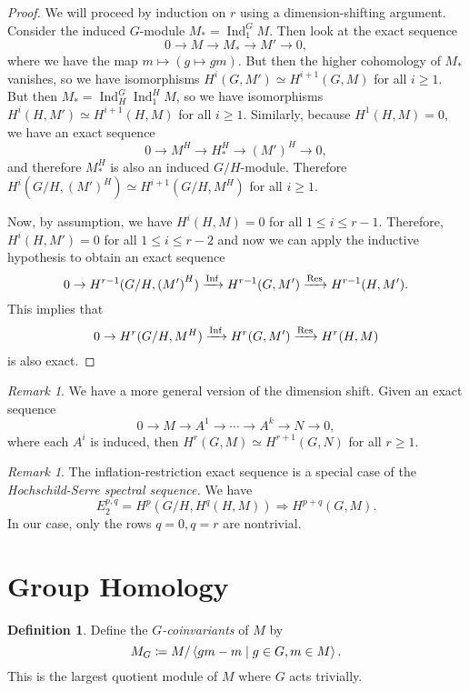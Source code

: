 \documentclass[leqno, openany]{memoir}
\theoremstyle{definition}
\newtheorem{defn}[thm]{Definition}
\theoremstyle{remark}
\newtheorem{rmk}[thm]{Remark}
\theoremstyle{plain}
\theoremstyle{definition}
\theoremstyle{remark}
\DeclareMathOperator{\Ind}{Ind}
\DeclareMathOperator{\Inf}{Inf}
\begin{document}
\begin{proof} We will proceed by induction on $r$ using a dimension-shifting
    argument. Consider the induced $G$-module $M_* = \Ind_1^G M$. Then look at
    the exact sequence \[ 0 \to M \to M_* \to M' \to 0, \] where we have the
    map $m \mapsto (g \mapsto gm)$. But then the higher cohomology of $M_*$
    vanishes, so we have isomorphisms $H^i(G, M') \simeq H^{i+1}(G, M)$ for all
    $i \geq 1$. But then $M_* = \Ind_H^G \Ind_1^H M$, so we have isomorphisms
    $H^i(H, M') \simeq H^{i+1}(H, M)$ for all $i \geq 1$. Similarly, because
    $H^1(H, M) = 0$, we have an exact sequence \[ 0 \to M^H \to H_*^H \to
    {(M')}^H \to 0, \] and therefore $M_*^H$ is also an induced $G/H$-module.
    Therefore $H^i(G/H, {(M')}^H) \simeq H^{i+1}(G/H, M^H)$ for all $i \geq 1$.

    Now, by assumption, we have $H^i(H, M) = 0$ for all $1 \leq i \leq r-1$.
    Therefore, $H^i(H, M') = 0$ for all $1 \leq i \leq r-2$ and now we can
    apply the inductive hypothesis to obtain an exact sequence \[ 0 \to
    H^{r-1}(G/H, {(M')}^H) \xrightarrow{\Inf} H^{r-1}(G, M') \xrightarrow{\Res}
H^{r-1}(H, M'). \] This implies that \[ 0 \to H^r(G/H, M^H) \xrightarrow{\Inf}
H^r(G, M') \xrightarrow{\Res} H^r(H, M) \] is also exact.  \end{proof}

\begin{rmk} We have a more general version of the dimension shift. Given an
    exact sequence \[ 0 \to M \to A^1 \to \cdots \to A^k \to N \to 0, \] where
each $A^i$ is induced, then $H^r(G, M) \simeq H^{r+1}(G, N)$ for all $r \geq
1$.  \end{rmk}

\begin{rmk} The inflation-restriction exact sequence is a special case of the
    \textit{Hochschild-Serre spectral sequence.} We have \[ E_2^{p,q} =
    H^p(G/H, H^q(H, M)) \Rightarrow H^{p+q}(G, M). \] In our case, only the
    rows $q = 0, q = r$ are nontrivial.  \end{rmk}

\section{Group Homology}%

\begin{defn} Define the \textit{$G$-coinvariants} of $M$ by \[ M_G \coloneqq M
/ \ev{gm - m \mid g \in G, m \in M}. \] This is the largest quotient module of
$M$ where $G$ acts trivially.  \end{defn}
\end{document}
